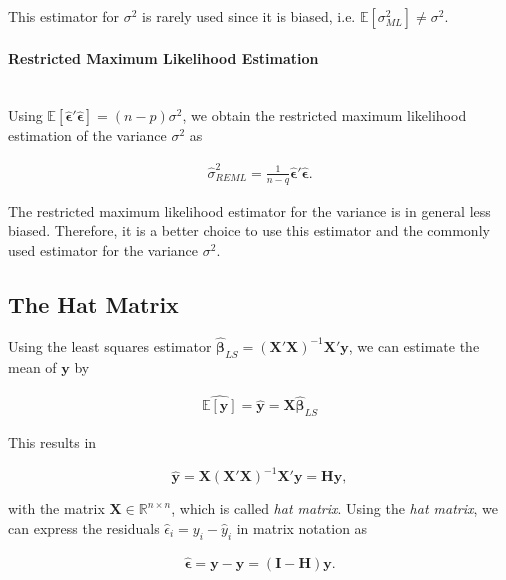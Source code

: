\documentclass[10pt,a4paper]{article}
\newcommand{\subsubsubsection}[1]{\paragraph{#1}\mbox{}\\}
\begin{document}
This estimator for $\sigma^2$ is rarely used since it is biased, i.e. $\mathbb{E}[\sigma^2_{ML}] \ne \sigma^2$. 

\subsubsubsection{Restricted Maximum Likelihood Estimation}

Using $\mathbb{E}[\boldsymbol{\hat{\epsilon}}' \boldsymbol{\hat{\epsilon}}] = (n - p)\sigma^2$, we obtain the restricted maximum likelihood estimation of the variance $\sigma^2$ as

\begin{align} \label{eq:sigma_REML}
	\hat \sigma^2_{REML} = \frac{1}{n-q} \boldsymbol{\hat{\epsilon}}' \boldsymbol{\hat{\epsilon}}.
\end{align}

The restricted maximum likelihood estimator for the variance is in general less biased. Therefore, it is a better choice to use this estimator and the commonly used estimator for the variance $\sigma^2$.

\subsection{The Hat Matrix}

Using the least squares estimator $\boldsymbol{\hat{\beta}}_{LS} = (\boldsymbol{X}'\boldsymbol{X})^{-1}\boldsymbol{X}'\boldsymbol{y}$, we can estimate the mean of $\boldsymbol{y}$ by 

\begin{align} \label{eq:mean_of_y}
	\widehat{\mathbb{E}[\boldsymbol{y}]} = \boldsymbol{\hat{y}} = \boldsymbol{X} \boldsymbol{\hat{\beta}}_{LS}
\end{align}

This results in 

\begin{equation} \label{HatMatrix}
	\boldsymbol{\hat{y}} = \boldsymbol{X}(\boldsymbol{X}'\boldsymbol{X})^{-1}\boldsymbol{X}'\boldsymbol{y} = \boldsymbol{H} \boldsymbol{y},
\end{equation}

with the matrix $\boldsymbol{X} \in \mathbb{R}^{n \times n}$, which is called \emph{hat matrix}. Using the \emph{hat matrix}, we can express the residuals $\hat \epsilon_i = y_i - \hat y_i$ in matrix notation as

\begin{align} \label{eq:residal_with_hat_matrix}
	\boldsymbol{\hat{\epsilon}} = \boldsymbol{y} - \boldsymbol{y} = (\boldsymbol{I} - \boldsymbol{H}) \boldsymbol{y}.
\end{align}
\end{document}
